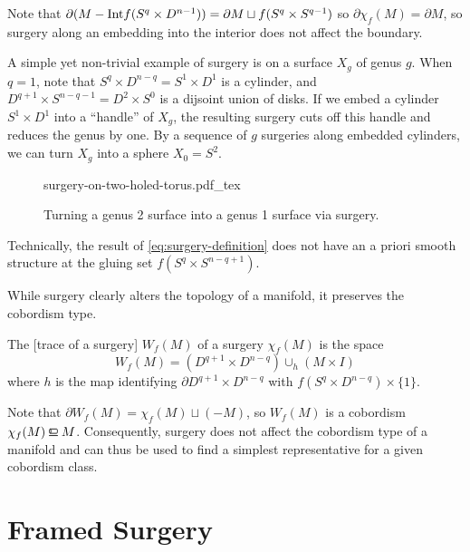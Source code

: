 Note that $\partial (M-{\operatorname{Int}} f(S^q\times D^{n-1})) = \partial M \sqcup f(S^q\times S^{q-1})$ so $\partial \chi_f(M) = \partial M$, so surgery along an embedding into the interior does not affect the boundary.

\begin{example}\label{exam:surgery-on-a-compact-surface}
	A simple yet non-trivial example of surgery is on a surface $X_g$ of genus $g$.
	When $q=1$, note that $S^q\times D^{n-q} = S^1\times D^1$ is a cylinder, and $D^{q+1}\times S^{n-q-1}=D^2\times S^0$ is a dijsoint union of disks.
	If we embed a cylinder $S^1\times D^1$ into a ``handle'' of $X_g$, the resulting surgery cuts off this handle and reduces the genus by one. By a sequence of $g$ surgeries along embedded cylinders, we can turn $X_g$ into a sphere $X_0 = S^2$.
	\begin{figure}[ht]
		\centering
		{surgery-on-two-holed-torus.pdf_tex}
		\caption{Turning a genus 2 surface into a genus 1 surface via surgery.}\label{fig:surgery-on-two-holed-torus}
	\end{figure}
\end{example}

\begin{remark}
	Technically, the result of \cref{eq:surgery-definition} does not have an a priori smooth structure at the gluing set $f(S^q\times S^{n-q+1})$.
\end{remark}

While surgery clearly alters the topology of a manifold, it preserves the cobordism type.
\begin{definition}
	The [trace of a surgery] $W_f(M)$ of a surgery $\chi_f(M)$ is the space
	\[
		W_f(M) = (D^{q+1}\times D^{n-q})\cup_h (M\times I)
	\]
	where $h$ is the map identifying $\partial D^{q+1}\times D^{n-q}$ with $f(S^q\times D^{n-q})\times \{1\}$.
\end{definition}

Note that $\partial W_f(M) = \chi_f(M) \sqcup (-M)$, so $W_f(M)$ is a cobordism $\chi_f(M) \bord M$. Consequently, surgery does not affect the cobordism type of a manifold and can thus be used to find a simplest representative for a given cobordism class.


\section{Framed Surgery}

